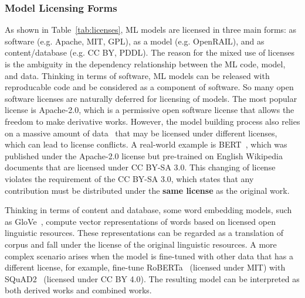 \subsubsection{Model Licensing Forms}
\label{sec:licensing}
As shown in Table~\ref{tab:licenses}, ML models are licensed in three main forms: as software (e.g. Apache, MIT, GPL), as a model (e.g. OpenRAIL), and as content/database (e.g. CC BY, PDDL).
The reason for the mixed use of licenses is the ambiguity in the dependency relationship between the ML code, model, and data.
Thinking in terms of software, ML models can be released with reproducable code and be considered as a component of software.
So many open software licenses are naturally deferred for licensing of models.
The most popular license is Apache-2.0, which is a permissive open software license that allows the freedom to make derivative works.
However, the model building process also relies on a massive amount of data~\cite{lecun2015deep} that may be licensed under different licenses, which can lead to license conflicts.
A real-world example is BERT~\cite{devlin2018bert}, which was published under the Apache-2.0 license but pre-trained on English Wikipedia documents that are licensed under CC BY-SA 3.0.
This changing of license violates the requirement of the CC BY-SA 3.0, which states that any contribution must be distributed under the \textbf{same license} as the original work.


Thinking in terms of content and database, some word embedding models, such as GloVe~\cite{pennington2014glove}, compute vector representations of words based on licensed open linguistic resources.
These representations can be regarded as a translation of corpus and fall under the license of the original linguistic resources.
A more complex scenario arises when the model is fine-tuned with other data that has a different license, for example, fine-tune RoBERTa~\cite{liu2019roberta} (licensed under MIT) with SQuAD2~\cite{rajpurkar2016squad} (licensed under CC BY 4.0).
The resulting model can be interpreted as both derived works and combined works.

